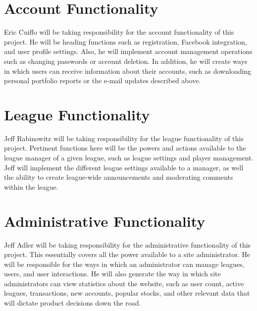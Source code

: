 \documentclass[11pt,letterpaper,oneside]{memoir}
\begin{document}
\section{Account Functionality}

Eric Cuiffo will be taking responsibility for the account functionality of this project. He will be
heading functions such as registration, Facebook integration, and user profile settings. Also,
he will implement account management operations such as changing passwords or account deletion.
In addition, he will create ways in which users can receive information about their accounts, such
as downloading personal portfolio reports or the e-mail updates described above.

\section{League Functionality}

Jeff Rabinowitz will be taking responsibility for the league functionality of this project. Pertinent
functions here will be the powers and actions available to the league manager of a given league,
such as league settings and player management. Jeff will implement the different league
settings available to a manager, as well the ability to create league-wide announcements and
moderating comments within the league.

\section{Administrative Functionality}

Jeff Adler will be taking responsibility for the administrative functionality of this project. This essentially
covers all the power available to a site administrator. He will be responsible for the ways in which an
administrator can manage leagues, users, and user interactions. He will also generate the way in which
site administrators can view statistics about the website, such as user count, active leagues, transactions,
new accounts, popular stocks, and other relevant data that will dictate product decisions down the road.
\end{document}

